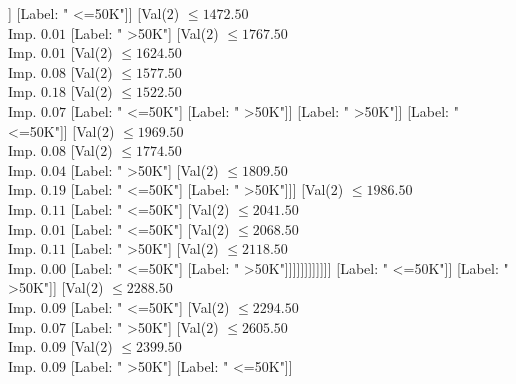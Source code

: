 \documentclass[margin=10pt]{standalone}
\begin{document}
\begin{forest}
																									[Label: " <=50K"]
																									[Label: " >50K"]]
																								[Label: " <=50K"]]
																							[Val($2$) $ \leq 1472.50$ \\ Imp. $0.01$
																								[Label: " >50K"]
																								[Val($2$) $ \leq 1767.50$ \\ Imp. $0.01$
																									[Val($2$) $ \leq 1624.50$ \\ Imp. $0.08$
																										[Val($2$) $ \leq 1577.50$ \\ Imp. $0.18$
																											[Val($2$) $ \leq 1522.50$ \\ Imp. $0.07$
																												[Label: " <=50K"]
																												[Label: " >50K"]]
																											[Label: " >50K"]]
																										[Label: " <=50K"]]
																									[Val($2$) $ \leq 1969.50$ \\ Imp. $0.08$
																										[Val($2$) $ \leq 1774.50$ \\ Imp. $0.04$
																											[Label: " >50K"]
																											[Val($2$) $ \leq 1809.50$ \\ Imp. $0.19$
																												[Label: " <=50K"]
																												[Label: " >50K"]]]
																										[Val($2$) $ \leq 1986.50$ \\ Imp. $0.11$
																											[Label: " <=50K"]
																											[Val($2$) $ \leq 2041.50$ \\ Imp. $0.01$
																												[Label: " <=50K"]
																												[Val($2$) $ \leq 2068.50$ \\ Imp. $0.11$
																													[Label: " >50K"]
																													[Val($2$) $ \leq 2118.50$ \\ Imp. $0.00$
																														[Label: " <=50K"]
																														[Label: " >50K"]]]]]]]]]]]]
																			[Label: " <=50K"]]
																		[Label: " >50K"]]
																	[Val($2$) $ \leq 2288.50$ \\ Imp. $0.09$
																		[Label: " <=50K"]
																		[Val($2$) $ \leq 2294.50$ \\ Imp. $0.07$
																			[Label: " >50K"]
																			[Val($2$) $ \leq 2605.50$ \\ Imp. $0.09$
																				[Val($2$) $ \leq 2399.50$ \\ Imp. $0.09$
																					[Label: " >50K"]
																					[Label: " <=50K"]]

\end{forest}
\end{document}
